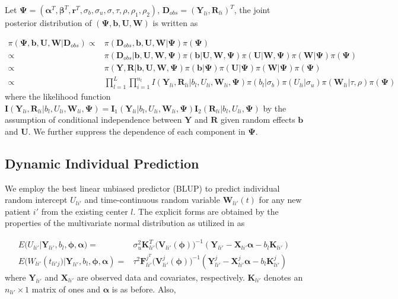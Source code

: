 Let $\bm{\Psi}=(\bm{\alpha}^T, \bm{\beta}^T, \bm{r}^T,\sigma_b,\sigma_u,\sigma,\tau,\rho,\rho_1,\rho_2)$, $\bm{D}_{obs}=(\bm{Y}_{li},\bm{R}_{li})^T$, the joint posterior distribution of $(\bm{\Psi},\bm{b},\bm{U},\bm{W})$ is written as 

\begin{equation}
\begin{split}
\pi(\bm{\Psi},\bm{b},\bm{U},\bm{W}|\bm{D}_{obs}) \propto &
  \pi(\bm{D}_{obs},\bm{b},\bm{U},\bm{W}|\bm{\Psi}) \pi(\bm{\Psi}) \\
\propto & \pi(\bm{D}_{obs}|\bm{b},\bm{U},\bm{W},\bm{\Psi}) \pi(\bm{b}|\bm{U},\bm{W},\bm{\Psi})\pi(\bm{U}|\bm{W},\bm{\Psi}) \pi(\bm{W}|\bm{\Psi})\pi(\bm{\Psi}) \\ 
 \propto & \pi(\bm{Y},\bm{R}|\bm{b},\bm{U},\bm{W},\bm{\Psi}) \pi(\bm{b}|\bm{\Psi}) \pi(\bm{U}|\bm{\Psi}) \pi(\bm{W}|\bm{\Psi}) \pi(\bm{\Psi}) \\
 \propto & \prod_{l=1}^{L}\prod_{i=1}^{n_l}I(\bm{Y}_{li},\bm{R}_{li}|b_{l}, U_{li}, \bm{W}_{li}, \bm{\Psi}) \pi(b_l|\sigma_b) \pi(U_{li}|\sigma_u) \pi(\bm{W}_{li}|\tau,\rho) \pi(\bm{\Psi})
\end{split}
\end{equation}
where the likelihood function $\bm{I}(\bm{Y}_{li},\bm{R}_{li}|b_l,U_{li},\bm{W}_{li},\bm{\Psi})= \bm{I}_1(\bm{Y}_{li}|b_l,U_{li},\bm{W}_{li},\bm{\Psi}) \bm{I}_2(\bm{R}_{li}|b_l,U_{li},\bm{\Psi})$ by the assumption of conditional independence between $\bm{Y}$ and $\bm{R}$ given random effects $\bm{b}$ and $\bm{U}$. We further suppress the dependence of each component in $\bm{\Psi}$.


\subsection{Dynamic Individual Prediction} \label{sec:chp2_pred}

We employ the best linear unbiased predictor (BLUP) to predict individual random intercept $U_{li'}$ and time-continuous random variable $\bm{W}_{li'}(t)$ for any new patient $i'$ from the existing center $l$. The explicit forms are obtained by the properties of the multivariate normal distribution as utilized in \cite{Diggle2015} as 

\begin{align}
    E\big(U_{li'}|\bm{Y}_{li'},b_l, \bm{\phi},\bm{\alpha}\big)  = & \sigma_u^2\bm{K}^T_{li'}\big(\bm{V}_{li'}(\bm{\phi})\big)^{-1} (\bm{Y}_{li'}-\bm{X}_{li'}\bm{\alpha}-b_l\bm{K}_{li'})\label{chp2:eq4} \\
    E\big(W_{li'}(t_{li'j}\big)|\bm{Y}_{li'},b_l, \bm{\phi},\bm{\alpha})  =  & \tau^2\bm{F}^{j^T}_{li'}\big(\bm{V}^j_{li'}(\bm{\phi})\big)^{-1}  (\bm{Y}^j_{li'}-\bm{X}^{j}_{li'}\bm{\alpha}-b_l\bm{K}^j_{li'}) \label{chp2:eq5}
\end{align}
where $\bm{Y}_{li'}$ and $\bm{X}_{li'}$ are observed data and covariates, respectively. $\bm{K}_{li'}$ denotes an $n_{li'} \times 1$ matrix of ones and $\bm{\alpha}$ is as before. Also,
 
